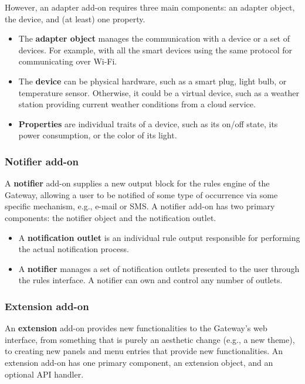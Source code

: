 However, an adapter add-on requires three main components: an adapter object, the device, and  (at least) one property.
\begin{itemize}
    \item The \textbf{adapter object} manages the communication with a device or a set of devices. For example, with all the smart devices using the same protocol for communicating over Wi-Fi.
    \item The \textbf{device} can be physical hardware, such as a smart plug, light bulb, or temperature sensor. Otherwise, it could be a virtual device, such as a weather station providing current weather conditions from a cloud service.
    \item \textbf{Properties} are individual traits of a device, such as its on/off state, its power consumption, or the color of its light.
\end{itemize}


\subsubsection{Notifier add-on}
\label{notifier}

A \textbf{notifier} add-on supplies a new output block for the \gls{rules engine} of the Gateway, allowing a user to be notified of some type of occurrence via some specific mechanism, e.g., e-mail or SMS. A notifier add-on has two primary components: the notifier object and the notification outlet.

\begin{itemize}
    \item A \textbf{notification outlet} is an individual rule output responsible for performing the actual notification process.
    \item A \textbf{notifier} manages a set of notification outlets presented to the user through the \gls{rules interface}. A notifier can own and control any number of outlets.
\end{itemize}


\subsubsection{Extension add-on}
\label{extension}

An \textbf{extension} add-on provides new functionalities to the Gateway's web interface, from something that is purely an aesthetic change (e.g., a new theme), to creating new panels and menu entries that provide new functionalities. An extension add-on has one primary component, an extension object, and an optional API handler.

